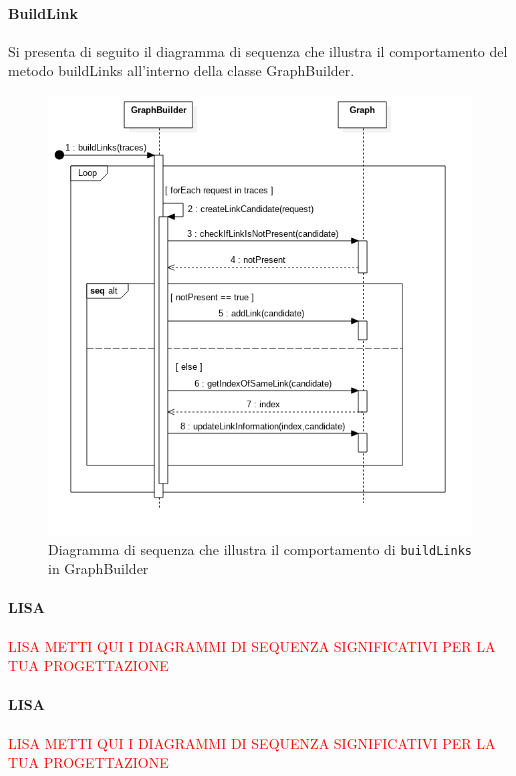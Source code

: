\paragraph{BuildLink} \Spazio
Si presenta di seguito il diagramma di sequenza che illustra il comportamento del metodo buildLinks all'interno della classe GraphBuilder.
\begin{figure}[H]
	\centering
	\includegraphics[width=1\textwidth]{Images/SequenceBuildLinks.png}
	\caption{Diagramma di sequenza che illustra il comportamento di \texttt{buildLinks} in GraphBuilder}
	\label{img:sequenceBuildLinks}
\end{figure}

\paragraph{LISA}
\textcolor{red}{LISA METTI QUI I DIAGRAMMI DI SEQUENZA SIGNIFICATIVI PER LA TUA PROGETTAZIONE}
\paragraph{LISA}
\textcolor{red}{LISA METTI QUI I DIAGRAMMI DI SEQUENZA SIGNIFICATIVI PER LA TUA PROGETTAZIONE}













